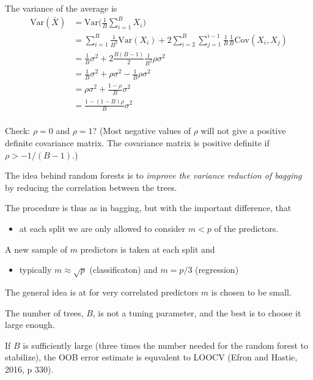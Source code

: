 \documentclass[ignorenonframetext,]{beamer}
\providecommand{\tightlist}{%
  \setlength{\itemsep}{0pt}\setlength{\parskip}{0pt}}
\begin{document}
\begin{frame}

The variance of the average is
\[\begin{aligned} \text{Var}(\bar{X}) &= \text{Var}\Big( \frac{1}{B}\sum_{i=1}^B X_i \Big) \\
&= \sum_{i=1}^B \frac{1}{B^2} \text{Var} (X_i) + 2 \sum_{i=2}^B \sum_{j=1}^{i-1} \frac{1}{B} \frac{1}{B} \text{Cov} (X_i, X_j) \\
&= \frac{1}{B} \sigma^2 + 2 \frac{B(B-1)}{2}\frac{1}{B^2} \rho \sigma^2 \\
&= \frac{1}{B} \sigma^2 + \rho \sigma^2 - \frac{1}{B} \rho \sigma^2 \\
&= \rho \sigma^2 + \frac{1-\rho}{B}\sigma^2\\
&= \frac{1-(1-B)\rho}{B} \sigma^2\\ \end{aligned}\]

Check: \(\rho=0\) and \(\rho=1\)? (Most negative values of \(\rho\) will
not give a positive definite covariance matrix. The covariance matrix is
positive definite if \(\rho>-1/(B-1)\).)

\end{frame}

\begin{frame}

The idea behind random forests is to \emph{improve the variance
reduction of bagging} by reducing the correlation between the trees.

The procedure is thus as in bagging, but with the important difference,
that

\begin{itemize}
\tightlist
\item
  at each split we are only allowed to consider \(m<p\) of the
  predictors.
\end{itemize}

A new sample of \(m\) predictors is taken at each split and

\begin{itemize}
\tightlist
\item
  typically \(m\approx \sqrt p\) (classificaton) and \(m=p/3\)
  (regression)
\end{itemize}

The general idea is at for very correlated predictors \(m\) is chosen to
be small.

\end{frame}

\begin{frame}

The number of trees, \(B\), is not a tuning parameter, and the best is
to choose it large enough.

If \(B\) is sufficiently large (three times the number needed for the
random forest to stabilize), the OOB error estimate is equvalent to
LOOCV (Efron and Hastie, 2016, p 330).

\end{frame}
\end{document}

